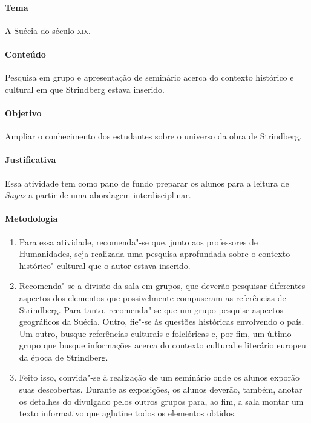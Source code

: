 \documentclass[12pt]{extarticle}
\begin{document}
\paragraph{Tema} A Suécia do século \textsc{xix}.

\paragraph{Conteúdo} Pesquisa em grupo e apresentação de seminário acerca do contexto histórico e cultural em que Strindberg estava inserido. 

\paragraph{Objetivo} Ampliar o conhecimento dos estudantes sobre o universo da obra de Strindberg.

\paragraph{Justificativa} Essa atividade tem como pano de fundo preparar os alunos para a leitura de \emph{Sagas}
a partir de uma abordagem interdisciplinar.

\paragraph{Metodologia}

\begin{enumerate}

\item Para essa atividade, recomenda"-se que, junto aos professores de Humanidades, seja
realizada uma pesquisa aprofundada sobre o contexto histórico"-cultural
que o autor estava inserido.

\item Recomenda"-se a divisão da
sala em grupos, que deverão pesquisar diferentes aspectos dos elementos que
possivelmente compuseram as referências de Strindberg. Para tanto,
recomenda"-se que um grupo pesquise aspectos geográficos da Suécia.
Outro, fie"-se às questões históricas envolvendo o país. Um outro, busque
referências culturais e folclóricas e, por fim, um último grupo que busque
informações acerca do contexto cultural e literário europeu da época de
Strindberg.

\item Feito isso, convida"-se à realização de um seminário onde os
alunos exporão suas descobertas. Durante as exposições, os alunos
deverão, também, anotar os detalhes do divulgado pelos outros grupos
para, ao fim, a sala montar um texto informativo que aglutine todos os
elementos obtidos.

\end{enumerate}
\end{document}
